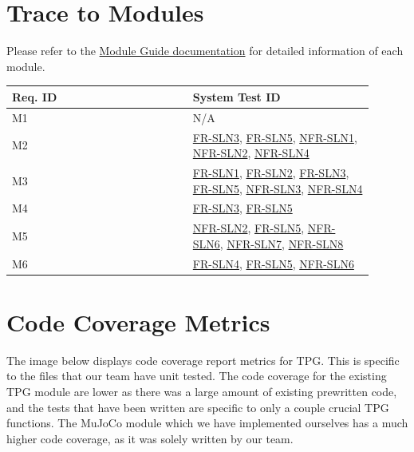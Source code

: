 \documentclass[12pt, titlepage]{article}
\begin{document}
\section{Trace to Modules}	
Please refer to the \href{https://github.com/TPGEngine/tpg/blob/main/docs/Design/SoftArchitecture/MG.pdf}{Module Guide documentation} \citep{MG} for detailed information of each module.
\begin{longtable}{|p{0.45\linewidth}|p{0.45\linewidth}|}
\hline
\textbf{Req. ID} & \textbf{System Test ID} \\
\hline
M1 & N/A\\
\hline
M2 & \hyperref[experiment_visualization]{FR-SLN3}, \hyperref[software_engineering_practices]{FR-SLN5}, \hyperref[usability]{NFR-SLN1}, \hyperref[usability]{NFR-SLN2}, \hyperref[github_actions]{NFR-SLN4} \\
\hline
M3 & \hyperref[mujoco_integration]{FR-SLN1}, \hyperref[mujoco_integration]{FR-SLN2}, \hyperref[experiment_visualization]{FR-SLN3}, \hyperref[software_engineering_practices]{FR-SLN5}, \hyperref[usability]{NFR-SLN3}, \hyperref[github_actions]{NFR-SLN4} \\
\hline
M4 & \hyperref[experiment_visualization]{FR-SLN3}, \hyperref[software_engineering_practices]{FR-SLN5} \\
\hline
M5 & \hyperref[usability]{NFR-SLN2}, \hyperref[software_engineering_practices]{FR-SLN5}, \hyperref[usability]{NFR-SLN6}, \hyperref[operational]{NFR-SLN7}, \hyperref[operational]{NFR-SLN8} \\
\hline
M6 & \hyperref[github_actions]{FR-SLN4}, \hyperref[software_engineering_practices]{FR-SLN5}, \hyperref[usability]{NFR-SLN6} \\
\hline
\end{longtable}	

\section{Code Coverage Metrics}

The image below displays code coverage report metrics for TPG. This is specific to the files that our team have unit tested. The code coverage for the existing TPG module are lower as there was a large amount of existing prewritten code, and the tests that have been written are specific to only a couple crucial TPG functions. The MuJoCo module which we have implemented ourselves has a much higher code coverage, as it was solely written by our team. 
\end{document}

